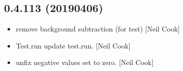 \documentclass[a4paper,10pt,english]{report}
\begin{document}
\subsection{0.4.113 (2019\sphinxhyphen{}04\sphinxhyphen{}06)}
\label{\detokenize{misc/changelog:id167}}\begin{itemize}
\item {} 
 \sphinxhyphen{} remove background subtraction (for test) {[}Neil
Cook{]}

\item {} 
Test.run \sphinxhyphen{} update test.run. {[}Neil Cook{]}

\item {} 
 \sphinxhyphen{} unfix negative values set to zero. {[}Neil Cook{]}

\end{itemize}
\end{document}
